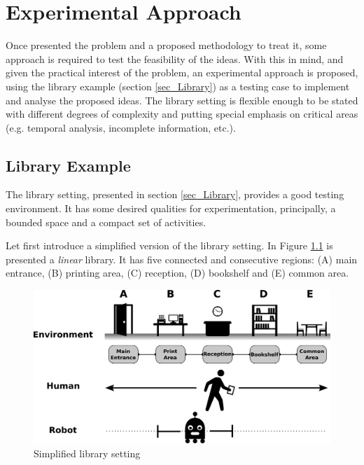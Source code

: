 \chapter{Experimental Approach} \label{ch_eva} %

Once presented the problem and a proposed methodology to treat it, some approach is required to test the feasibility of the ideas.
With this in mind, and given the practical interest of the problem, an experimental approach is proposed, using the library example (section \ref{sec_Library}) as a testing case to implement and analyse the proposed ideas. 
The library setting is flexible enough to be stated with different degrees of complexity and putting special emphasis on critical areas (e.g. temporal analysis, incomplete information, etc.).


\section{Library Example}

The library setting, presented in section \ref{sec_Library}, provides a good testing environment.
It has some desired qualities for experimentation, principally, a bounded space and a compact set of activities.

Let first introduce a simplified version of the library setting.
In Figure \ref{fig:ex_library} is presented a \textit{linear} library. 
It has five connected and consecutive regions: (A) main entrance, (B) printing area, (C) reception, (D) bookshelf and (E) common area.

\begin{figure}[h]
\centering
\includegraphics[width=\textwidth]{fig/ex_library.pdf}
\caption{Simplified library setting}
\label{fig:ex_library}
\end{figure}


